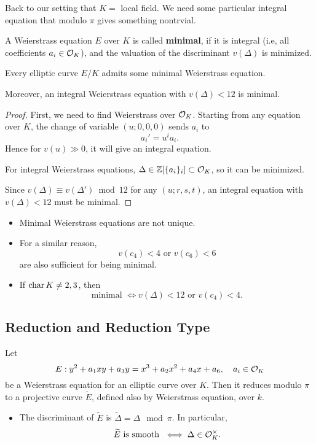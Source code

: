 Back to our setting that $K = $ local field.
We need some particular integral equation that modulo $\pi$ gives something nontrvial.
\begin{definition}
    A Weierstrass equation $E$ over $K$ is called \textbf{minimal}, if it is integral (i.e, all coefficients $a_i\in \mathcal{O}_K$), and the valuation of the discriminant $v(\Delta)$ is minimized.
\end{definition}
\begin{lemma}
    Every elliptic curve $E/K$ admits some minimal Weierstrass equation.\par
    Moreover, an integral Weierstrass equation with $v(\Delta) < 12$ is minimal.
\end{lemma}
\begin{proof}
    First, we need to find Weierstrass over $\mathcal{O}_K$.
    Starting from any equation over $K$,
    the change of variable $(u; 0, 0, 0)$ sends $a_i$ to \[a_i' = u^ia_i.\]
    Hence for $v(u)\gg 0$, it will give an integral equation.

    For integral Weierstrass equations, $\Delta\in \mathbb{Z}[\{a_i\}_i]\subset \mathcal{O}_K$, so it can be minimized.

    Since $v(\Delta)\equiv v(\Delta')\bmod 12$
    for any $(u; r, s, t)$, an integral equation with $v(\Delta)  <12$ must be minimal.
\end{proof}

\begin{remark}
    \begin{itemize}
        \item Minimal Weierstrass equations are not unique.
        \item For a similar reason, \[v(c_4) < 4\text{ or } v(c_6) < 6\]
        are also sufficient for being minimal.
        \item If $\operatorname{char} K \ne 2, 3$,
        then \[\text{minimal }\iff v(\Delta) < 12\text{ or } v(c_4) < 4.\]
    \end{itemize}
\end{remark}

\subsection{Reduction and Reduction Type}
Let \[E : 
    y^2 + a_1xy + a_3y = x^3 + a_2x^2 + a_4x + a_6,\quad a_i\in \mathcal{O}_K\]
be a Weierstrass equation for an elliptic curve over $K$.
Then it reduces modulo $\pi$ to a projective curve $\tilde{E}$, defined also by Weierstrass equation,
over $k$.
\begin{itemize}
    \item The discriminant of $\tilde{E}$ is $\tilde{\Delta} = \Delta\mod\pi$.
    In particular,\[\widetilde{E}\text{ is smooth }\iff \Delta\in\mathcal{O}_K^\times.\]
\end{itemize}

